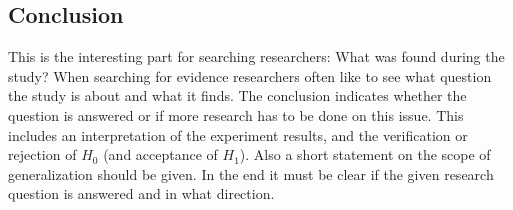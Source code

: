 
\subsection{Conclusion}
\label{subsec:conclusion}

This is the interesting part for searching researchers: What was found during the study? When searching for evidence researchers often like to see what question the study is about and what it finds. The conclusion indicates whether the question is answered or if more research has to be done on this issue. This includes an interpretation of the experiment results, and the verification or rejection of $H_0$ (and acceptance of $H_1$). Also a short statement on the scope of generalization should be given. In the end it must be clear if the given research question is answered and in what direction. 